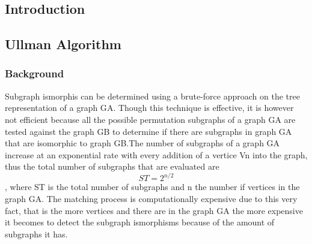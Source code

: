 \label{Algorithm}


\subsection{Introduction}

\subsection{Ullman Algorithm}
\label{Ullman Algorithm}



\subsubsection{Background}
Subgraph ismorphis can be determined using a brute-force approach on the tree representation of a graph G{\tiny A}. Though this technique is effective, it is however not efficient because all the possible
permutation subgraphs of a graph G{\tiny A} are tested against the graph G{\tiny B} to determine if there are subgraphs in graph G{\tiny A} that are isomorphic to graph G{\tiny B}.The number of subgraphs of a graph G{\tiny A} increase at an exponential rate with every addition of a vertice Vn into the graph, thus the total number of subgraphs that are evaluated are  
	\begin{equation}
		ST = 2^{n/2}
	\end{equation} 
, where ST is the total
number of subgraphs and n the number if vertices in the graph G{\tiny A}.
The matching process is computationally expensive due to this very fact, that is the more vertices and there are in the graph G{\tiny A} the more expensive it becomes to detect the subgraph ismorphisms
because of the amount of subgraphs it has.


